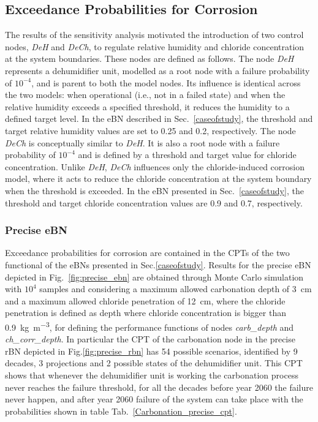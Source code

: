 \subsection{Exceedance Probabilities for Corrosion}

The results of the sensitivity analysis motivated the introduction of two control nodes, \textit{DeH} and \textit{DeCh}, to regulate relative humidity and chloride concentration at the system boundaries. These nodes are defined as follows. The node \textit{DeH} represents a dehumidifier unit, modelled as a root node with a failure probability of $10^{-4}$, and is parent to both the model nodes.
Its influence is identical across the two models: when operational (i.e., not in a failed state) and when the relative humidity exceeds a specified threshold, it reduces the humidity to a defined target level. In the eBN described in Sec.~\ref{caseofstudy}, the threshold and target relative humidity values are set to 0.25 and 0.2, respectively.
The node \textit{DeCh} is conceptually similar to \textit{DeH}. It is also a root node with a failure probability of $10^{-4}$ and is defined by a threshold and target value for chloride concentration. Unlike \textit{DeH}, \textit{DeCh} influences only the chloride-induced corrosion model, where it acts to reduce the chloride concentration at the system boundary when the threshold is exceeded. In the eBN presented in Sec.~\ref{caseofstudy}, the threshold and target chloride concentration values are 0.9 and 0.7, respectively.\\

\subsubsection{Precise eBN}
Exceedance probabilities for corrosion are contained in the CPTs of the two functional of the eBNs presented in Sec.\ref{caseofstudy}. 
Results for the precise eBN depicted in Fig.~\ref{fig:precise_ebn} are obtained through Monte Carlo simulation with $10^4$ samples and considering a maximum allowed carbonation depth of \SI{3}{\centi\meter} and a maximum allowed chloride penetration of \SI{12}{\centi\meter}, where the chloride penetration is defined as depth where chloride concentration is bigger than \SI{0.9}{\kilogram\per\cubic\meter}, for defining the performance functions of nodes \textit{carb_depth} and \textit{ch_corr_depth}.
In particular the CPT of the carbonation node in the precise rBN depicted in Fig.\ref{fig:precise_rbn} has 54 possible scenarios, identified by 9 decades, 3 projections and 2 possible states of the dehumidifier unit. This CPT shows that whenever the dehumidifier unit is working the carbonation process never reaches the failure threshold, for all the decades before year 2060 the failure never happen, and after year 2060 failure of the system can take place with the probabilities shown in table Tab.~\ref{Carbonation_precise_cpt}.

